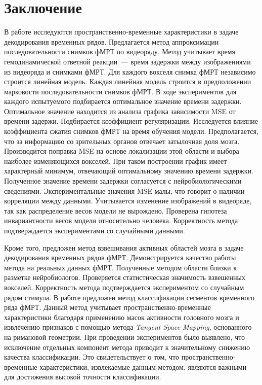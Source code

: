 \section{Заключение}                        %
В работе исследуются пространственно-временные характеристики в задаче декодирования временных рядов.
Предлагается метод аппроксимации последовательности снимков фМРТ по видеоряду. 
Метод учитывает время гемодинамической ответной реакции~--- время задержки между изображениями из видеоряда и снимками фМРТ. 
Для каждого вокселя снимка фМРТ независимо строится линейная модель. 
Каждая линейная модель строится в предположении марковости последовательности снимков фМРТ. 
В ходе экспериментов для каждого испытуемого подбирается оптимальное значение времени задержки. 
Оптимальное значение находится из анализа графика зависимости MSE от времени задержи.
Подбирается коэффициент регуляризации. 
Исследуется влияние коэффициента сжатия снимков фМРТ на время обучения модели.
Предполагается, что за информацию со зрительных органов отвечает затылочная доля мозга.
Производится поправка MSE на основе локализации этой области и выбора наиболее изменяющихся вокселей. 
При таком построении график имеет характерный минимум, отвечающий оптимальному значению времени задержки.
Полученное значение времени задержки согласуется с нейробиологическими сведениями.
Экспериментальные значения MSE малы, что говорит о наличии корреляции между данными. 
Учитывается изменение изображений в видеоряде, так как распределение весов модели не вырождено.
Проверена гипотеза инвариантности весов модели относительно человека. 
Корректность метода подтверждается экспериментами со случайными данными. 

Кроме того, предложен метод взвешивания активных областей мозга в задаче декодирования временных рядов фМРТ. Демонстрируется качество работы метода на реальных данных фМРТ. Полученные методом области близки к разметке нейробиологов. Проверяется статистическая значимость взвешенных вокселей. Корректность метода подтверждается экспериментом со случайным рядом стимула. В работе предложен метод классификации сегментов временного ряда фМРТ. Данный метод учитывает пространственно-временные характеристики благодаря применению масок активности головного мозга и извлечению признаков с помощью метода \textit{Tangent Space Mapping}, основанного на римановой геометрии. При проведении экспериментов было выявлено, что исключение отдельных компонент метода приводит к значительному снижению качества классификации. Это свидетельствует о том, что пространственно-временные характеристики, извлекаемые данным методом, являются важными для достижения высокой точности классификации.
